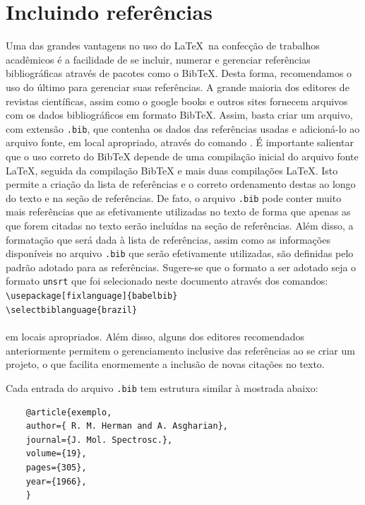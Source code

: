 \section{Incluindo referências}

Uma das grandes vantagens no uso do \LaTeX\ na confecção de trabalhos acadêmicos é a facilidade de se incluir, numerar e gerenciar
referências bibliográficas através de pacotes como o BibTeX. Desta forma, recomendamos o uso do último para gerenciar suas referências.
A grande maioria dos editores de revistas científicas, assim como o google books e outros sites fornecem arquivos com os dados
bibliográficos em formato BibTeX. Assim, basta criar um arquivo, com extensão \verb+.bib+, que contenha os dados das referências usadas
e adicioná-lo ao arquivo fonte, em local apropriado, através do comando \verb++. É importante
salientar que o uso correto do BibTeX depende de uma compilação inicial do arquivo fonte \LaTeX, seguida da compilação BibTeX e mais
duas compilações   \LaTeX. Isto permite a criação da lista de referências e o correto ordenamento destas ao longo do texto e na seção
de referências. De fato, o arquivo \verb+.bib+ pode conter muito mais referências que as efetivamente utilizadas no texto de forma que
apenas as que forem citadas no texto serão incluídas na seção de referências.  Além disso, a formatação que será dada à lista de
referências, assim como as informações disponíveis no arquivo \verb+.bib+ que serão efetivamente utilizadas, são definidas pelo padrão
adotado para as referências. Sugere-se que o formato a ser adotado seja o formato \verb+unsrt+ que foi selecionado neste documento
através dos comandos:\\ \verb+\usepackage[fixlanguage]{babelbib}+\\ \verb+\selectbiblanguage{brazil}+\\
\verb++\\ em locais apropriados. Além disso, alguns dos editores recomendados anteriormente permitem o
gerenciamento inclusive das referências ao se criar um projeto, o que facilita enormemente a inclusão de novas citações no texto.

Cada entrada do arquivo \verb+.bib+ tem estrutura similar à mostrada abaixo:
\begin{verbatim}
    @article{exemplo,
    author={ R. M. Herman and A. Asgharian},
    journal={J. Mol. Spectrosc.},
    volume={19},
    pages={305},
    year={1966},
    }
\end{verbatim}

